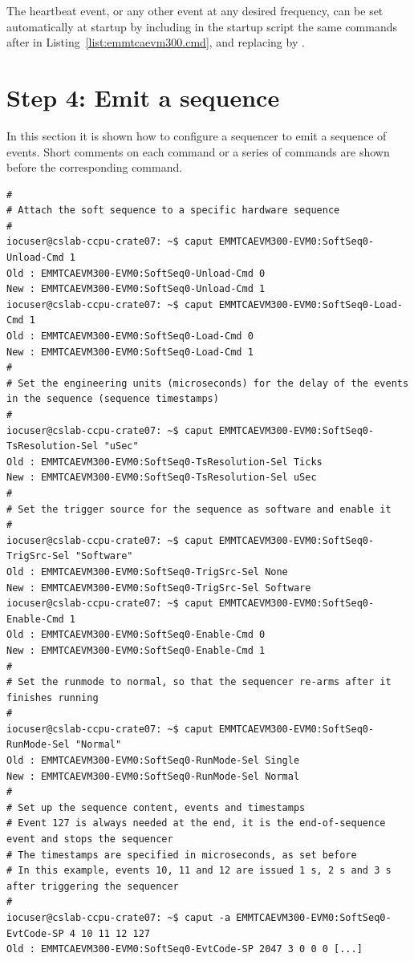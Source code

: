 \documentclass[11pt
  , a4paper
  , article
  , oneside
  , showtrims
]{memoir}
\begin{document}
The heartbeat event, or any other event at any desired frequency, can be set automatically at startup by including in the startup script the same commands after  in Listing~\ref{list:emmtcaevm300.cmd}, and replacing  by .


\section{Step 4: Emit a sequence}
In this section it is shown how to configure a sequencer to emit a sequence of events. Short comments on each command or a series of commands are shown before the corresponding command.
\begin{lstlisting}[style=termstyle]
#
# Attach the soft sequence to a specific hardware sequence
#
iocuser@cslab-ccpu-crate07: ~$ caput EMMTCAEVM300-EVM0:SoftSeq0-Unload-Cmd 1
Old : EMMTCAEVM300-EVM0:SoftSeq0-Unload-Cmd 0
New : EMMTCAEVM300-EVM0:SoftSeq0-Unload-Cmd 1
iocuser@cslab-ccpu-crate07: ~$ caput EMMTCAEVM300-EVM0:SoftSeq0-Load-Cmd 1
Old : EMMTCAEVM300-EVM0:SoftSeq0-Load-Cmd 0
New : EMMTCAEVM300-EVM0:SoftSeq0-Load-Cmd 1
#
# Set the engineering units (microseconds) for the delay of the events in the sequence (sequence timestamps)
#
iocuser@cslab-ccpu-crate07: ~$ caput EMMTCAEVM300-EVM0:SoftSeq0-TsResolution-Sel "uSec"
Old : EMMTCAEVM300-EVM0:SoftSeq0-TsResolution-Sel Ticks
New : EMMTCAEVM300-EVM0:SoftSeq0-TsResolution-Sel uSec
#
# Set the trigger source for the sequence as software and enable it
#
iocuser@cslab-ccpu-crate07: ~$ caput EMMTCAEVM300-EVM0:SoftSeq0-TrigSrc-Sel "Software"
Old : EMMTCAEVM300-EVM0:SoftSeq0-TrigSrc-Sel None
New : EMMTCAEVM300-EVM0:SoftSeq0-TrigSrc-Sel Software
iocuser@cslab-ccpu-crate07: ~$ caput EMMTCAEVM300-EVM0:SoftSeq0-Enable-Cmd 1
Old : EMMTCAEVM300-EVM0:SoftSeq0-Enable-Cmd 0
New : EMMTCAEVM300-EVM0:SoftSeq0-Enable-Cmd 1
#
# Set the runmode to normal, so that the sequencer re-arms after it finishes running
#
iocuser@cslab-ccpu-crate07: ~$ caput EMMTCAEVM300-EVM0:SoftSeq0-RunMode-Sel "Normal"
Old : EMMTCAEVM300-EVM0:SoftSeq0-RunMode-Sel Single
New : EMMTCAEVM300-EVM0:SoftSeq0-RunMode-Sel Normal
#
# Set up the sequence content, events and timestamps
# Event 127 is always needed at the end, it is the end-of-sequence event and stops the sequencer
# The timestamps are specified in microseconds, as set before
# In this example, events 10, 11 and 12 are issued 1 s, 2 s and 3 s after triggering the sequencer
#
iocuser@cslab-ccpu-crate07: ~$ caput -a EMMTCAEVM300-EVM0:SoftSeq0-EvtCode-SP 4 10 11 12 127
Old : EMMTCAEVM300-EVM0:SoftSeq0-EvtCode-SP 2047 3 0 0 0 [...]

\end{lstlisting}
\end{document}
